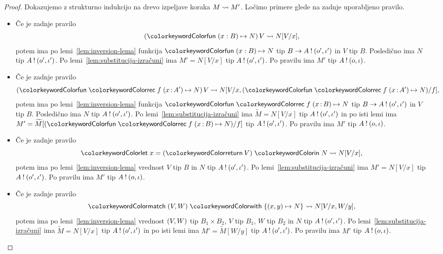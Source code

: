 

\begin{proof}
	Dokazujemo z strukturno indukcijo na drevo izpeljave koraka $M \leadsto M'$.
	Ločimo primere glede na zadnje uporabljeno pravilo.
	
	\begin{itemize}
		\item Če je zadnje pravilo $$\tmapp{(\tmfun{x : B}{N})}{V} \reduces N[V/x],$$ potem ima po lemi~\ref{lem:inversion-lema} funkcija $\tmfun{x : B}{N}$ tip $B \to A \mathbin{!} (o', \iota')$ in $V$ tip $B$. Posledično ima $N$ tip $A \mathbin{!} (o', \iota')$. Po lemi~\ref{lem:substitucija-izračuni} ima $M' = N[V/x]$ tip $A \mathbin{!} (o', \iota')$.
		Po pravilu  ima $M'$ tip $A \mathbin{!} (o, \iota)$.
		
		\item Če je zadnje pravilo $$\tmapp{(\tmfunrec{f}{x \of A'}{N})}{V} \reduces N[V/x, (\tmfunrec{f}{x \of A'}{N})/f],$$ potem ima po lemi~\ref{lem:inversion-lema} funkcija $\tmfunrec{f}{x \of B}{N}$ tip $B \to A \mathbin{!} (o', \iota')$ in $V$ tip $B$. Posledično ima $N$ tip $A \mathbin{!} (o', \iota')$. Po lemi~\ref{lem:substitucija-izračuni} ima $\widetilde{M} = N[V/x]$ tip $A \mathbin{!} (o', \iota')$ in po isti lemi ima $M' = \widetilde{M}[(\tmfunrec{f}{x \of B}{N})/f]$ tip $A \mathbin{!} (o', \iota')$.
		Po pravilu  ima $M'$ tip $A \mathbin{!} (o, \iota)$.
		
		\item Če je zadnje pravilo $$\tmlet{x}{(\tmreturn V)}{N} \reduces N[V/x],$$ potem ima po lemi~\ref{lem:inversion-lema} vrednost $V$ tip $B$ in $N$ tip $A \mathbin{!} (o', \iota')$.
		Po lemi~\ref{lem:substitucija-izračuni} ima $M' = N[V/x]$ tip $A \mathbin{!} (o', \iota')$.
		Po pravilu  ima $M'$ tip $A \mathbin{!} (o, \iota)$.
		
		\item Če je zadnje pravilo $$\tmmatch{\tmpair{V}{W}}{\tmpair{x}{y} \mapsto N} \reduces N[V/x, W/y],$$ potem ima po lemi~\ref{lem:inversion-lema} vrednost $( V , W )$ tip $B_1 \times B_2$, $V$ tip $B_1$, $W$ tip $B_2$ in $N$ tip $A \mathbin{!} (o', \iota')$. Po lemi~\ref{lem:substitucija-izračuni} ima $\widetilde{M} = N[V/x]$ tip $A \mathbin{!} (o', \iota')$ in po isti lemi ima $M' = \widetilde{M}[W/y]$ tip $A \mathbin{!} (o', \iota')$.
		Po pravilu  ima $M'$ tip $A \mathbin{!} (o, \iota)$.
		

\end{itemize}
\end{proof}
